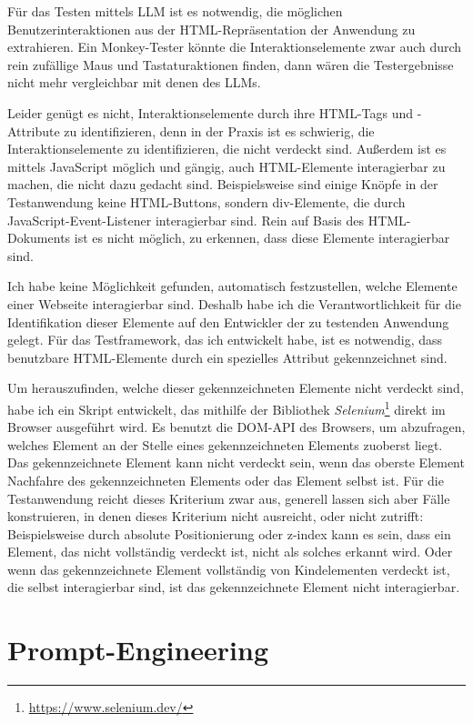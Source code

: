Für das Testen mittels LLM ist es notwendig, die möglichen Benutzerinteraktionen aus der HTML-Repräsentation der Anwendung zu extrahieren.
Ein Monkey-Tester könnte die Interaktionselemente zwar auch durch rein zufällige Maus und Tastaturaktionen finden, dann wären die Testergebnisse nicht mehr vergleichbar mit denen des LLMs.

Leider genügt es nicht, Interaktionselemente durch ihre HTML-Tags und -Attribute zu identifizieren, denn in der Praxis ist es schwierig, die Interaktionselemente zu identifizieren, die nicht verdeckt sind.
Außerdem ist es mittels JavaScript möglich und gängig, auch HTML-Elemente interagierbar zu machen, die nicht dazu gedacht sind.
Beispielsweise sind einige Knöpfe in der Testanwendung keine HTML-Buttons, sondern div-Elemente, die durch JavaScript-Event-Listener interagierbar sind.
Rein auf Basis des HTML-Dokuments ist es nicht möglich, zu erkennen, dass diese Elemente interagierbar sind.

Ich habe keine Möglichkeit gefunden, automatisch festzustellen, welche Elemente einer Webseite interagierbar sind.
Deshalb habe ich die Verantwortlichkeit für die Identifikation dieser Elemente auf den Entwickler der zu testenden Anwendung gelegt.
Für das Testframework, das ich entwickelt habe, ist es notwendig, dass benutzbare HTML-Elemente durch ein spezielles Attribut gekennzeichnet sind.

Um herauszufinden, welche dieser gekennzeichneten Elemente nicht verdeckt sind, habe ich ein Skript entwickelt, das mithilfe der Bibliothek \textit{Selenium}\footnote{\url{https://www.selenium.dev/}} direkt im Browser ausgeführt wird.
Es benutzt die DOM-API des Browsers, um abzufragen, welches Element an der Stelle eines gekennzeichneten Elements zuoberst liegt.
Das gekennzeichnete Element kann nicht verdeckt sein, wenn das oberste Element Nachfahre des gekennzeichneten Elements oder das Element selbst ist.
Für die Testanwendung reicht dieses Kriterium zwar aus, generell lassen sich aber Fälle konstruieren, in denen dieses Kriterium nicht ausreicht, oder nicht zutrifft:
Beispielsweise durch absolute Positionierung oder z-index kann es sein, dass ein Element, das nicht vollständig verdeckt ist, nicht als solches erkannt wird.
Oder wenn das gekennzeichnete Element vollständig von Kindelementen verdeckt ist, die selbst interagierbar sind, ist das gekennzeichnete Element nicht interagierbar.

\section{Prompt-Engineering}

